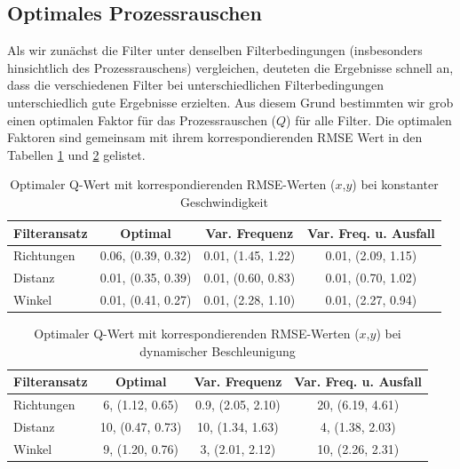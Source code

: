 \documentclass[conference]{IEEEtran}[10pt]
\begin{document}
\subsection{Optimales Prozessrauschen}

Als wir zunächst die Filter unter denselben Filterbedingungen (insbesonders hinsichtlich des Prozessrauschens) vergleichen, deuteten die Ergebnisse schnell an, dass die verschiedenen Filter bei unterschiedlichen Filterbedingungen unterschiedlich gute Ergebnisse erzielten. Aus diesem Grund bestimmten wir grob einen optimalen Faktor für das Prozessrauschen (\(Q\)) für alle Filter. Die optimalen Faktoren sind gemeinsam mit ihrem korrespondierenden RMSE Wert in den Tabellen \ref{tab:optimal-Q-cv} und \ref{tab:optimal-Q-da} gelistet.

\begin{table}[h]
\centering
\begin{tabular}{|l|c|c|c|}
\hline
\textbf{Filteransatz} & \textbf{Optimal} & \textbf{Var. Frequenz} & \textbf{Var. Freq. u. Ausfall} \\ \hline
Richtungen & 0.06, (0.39, 0.32)  & 0.01, (1.45, 1.22) & 0.01, (2.09, 1.15)   \\ \hline
Distanz & 0.01, (0.35, 0.39) & 0.01, (0.60, 0.83) & 0.01, (0.70, 1.02) \\ \hline
Winkel & 0.01, (0.41, 0.27) & 0.01, (2.28, 1.10) & 0.01, (2.27, 0.94) \\ \hline
\end{tabular}
\caption{Optimaler Q-Wert mit korrespondierenden RMSE-Werten (\(x\),\(y\)) bei konstanter Geschwindigkeit}
\label{tab:optimal-Q-cv}
\end{table}



\begin{table}[h]
\centering
\begin{tabular}{|l|c|c|c|}
\hline
\textbf{Filteransatz} & \textbf{Optimal} & \textbf{Var. Frequenz} & \textbf{Var. Freq. u. Ausfall} \\ \hline
Richtungen & 6, (1.12, 0.65)  & 0.9, (2.05, 2.10) & 20, (6.19, 4.61)   \\ \hline
Distanz & 10, (0.47, 0.73) & 10, (1.34, 1.63) & 4, (1.38, 2.03) \\ \hline
Winkel & 9, (1.20, 0.76) & 3, (2.01, 2.12) & 10, (2.26, 2.31) \\ \hline
\end{tabular}
\caption{Optimaler Q-Wert mit korrespondierenden RMSE-Werten (\(x\),\(y\)) bei dynamischer Beschleunigung}
\label{tab:optimal-Q-da}
\end{table}
\end{document}
